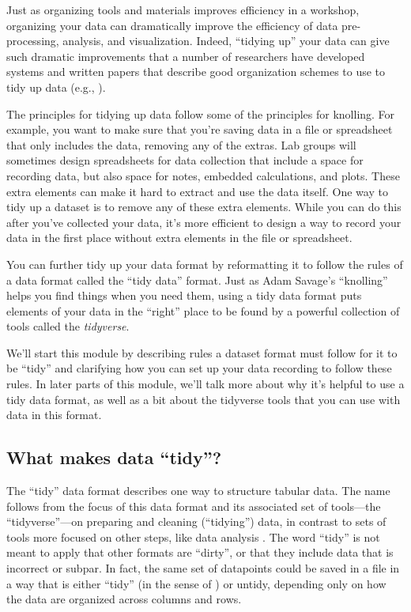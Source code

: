 \documentclass[]{tufte-book}
\begin{document}
Just as organizing tools and materials improves efficiency in a workshop,
organizing your data can dramatically improve the efficiency of data
pre-processing, analysis, and visualization. Indeed, ``tidying up'' your data
can give such dramatic improvements that a number of researchers have
developed systems and written papers that describe good organization schemes
to use to tidy up data (e.g., \citep{wickham2014tidy}).

The principles for tidying up data follow some of the principles for knolling.
For example, you want to make sure that you're saving data in a file or
spreadsheet that only includes the data, removing any of the extras. Lab groups
will sometimes design spreadsheets for data collection that include a space for
recording data, but also space for notes, embedded calculations, and plots.
These extra elements can make it hard to extract and use the data itself. One
way to tidy up a dataset is to remove any of these extra elements. While you can
do this after you've collected your data, it's more efficient to design a way to
record your data in the first place without extra elements in the file or
spreadsheet.

You can further tidy up your data format by reformatting it to
follow the rules of a data format called the ``tidy data'' format. Just as
Adam Savage's ``knolling'' helps you find things when you need them, using
a tidy data format puts elements of your data in the ``right'' place to be
found by a powerful collection of tools called the \emph{tidyverse}.

We'll start this module by describing rules a dataset format must follow for it
to be ``tidy'' and clarifying how you can set up your data recording to follow
these rules. In later parts of this module, we'll talk more about why it's
helpful to use a tidy data format, as well as a bit about the tidyverse tools
that you can use with data in this format.

\subsection{What makes data ``tidy''?}\label{what-makes-data-tidy}

The ``tidy'' data format describes one way to structure tabular data. The name
follows from the focus of this data format and its associated set of tools---the
``tidyverse''---on preparing and cleaning (``tidying'') data, in contrast to sets of
tools more focused on other steps, like data analysis \citep{wickham2014tidy}. The
word ``tidy'' is not meant to apply that other formats are ``dirty'', or that they
include data that is incorrect or subpar. In fact, the same set of datapoints
could be saved in a file in a way that is either ``tidy'' (in the sense of
\citep{wickham2014tidy}) or untidy, depending only on how the data are organized
across columns and rows.
\end{document}
